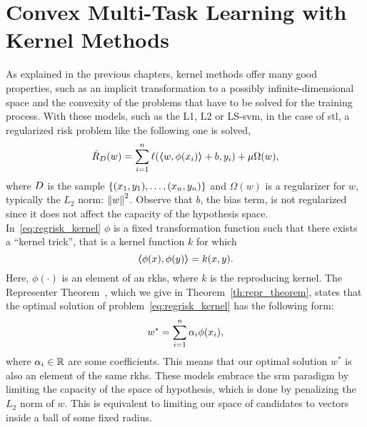 \section{Convex Multi-Task Learning with Kernel Methods}
\label{sec:convexmlt_kernel}


As explained in the previous chapters, kernel methods offer many good properties, such as an implicit transformation to a possibly infinite-dimensional space and the convexity of the problems that have to be solved for the training process. With these models, such as the L1, L2 or LS-\acrshort{svm}, in the case of \acrshort{stl}, a regularized risk problem like the following one is solved,
\begin{equation}
    \label{eq:regrisk_kernel}
    \emprisk({w}) = \sum_{i=1}^{\nsamples} \lossf(\dotp{w}{\phi({x}_i)} + b, y_i) + \mu \Omega({w}) ,
\end{equation}
where $D$ is the sample $\{(x_1, y_1), \ldots, (x_n, y_n)\}$ and $\Omega(w)$ is a regularizer for ${w}$, typically the $L_2$ norm: $\left\lVert w\right\rVert^2$. Observe that $b$, the bias term, is not regularized since it does not affect the capacity of the hypothesis space.
In~\eqref{eq:regrisk_kernel} $\phi$ is a fixed transformation function such that there exists a ``kernel trick'', that is a kernel function $k$ for which
\begin{equation}
    \nonumber
    \bm{\left\langle} \phi(x), \phi(y) \bm{\right\rangle} = k(x, y).
\end{equation}
Here, $\phi(\cdot)$ is an element of an \acrshort{rkhs}, where $k$ is the reproducing kernel. 
The Representer Theorem~\citep*{ScholkopfHS01}, which we give in Theorem~\ref{th:repr_theorem}, states that the optimal solution of problem~\eqref{eq:regrisk_kernel} has the following form:
\begin{equation}
    \nonumber
    w^* = \sum_{i=1}^n \alpha_i \phi(x_i) ,
\end{equation}
where $\alpha_i \in \mathbb{R}$ are some coefficients. This means that our optimal solution $w^*$ is also an element of the same \acrshort{rkhs}.
These models embrace the \acrfull{srm} paradigm by limiting the capacity of the space of hypothesis, which is done by penalizing the $L_2$ norm of $w$. This is equivalent to limiting our space of candidates to vectors inside a ball of some fixed radius.

